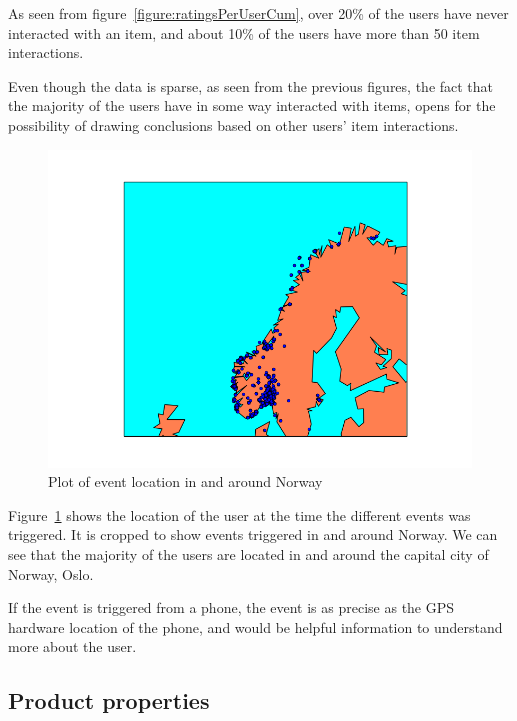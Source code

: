         As seen from figure~\ref{figure:ratingsPerUserCum}, over 20\% of the users have never interacted with an item, and about 10\% of the users have more than 50 item interactions.

        Even though the data is sparse, as seen from the previous figures, the fact that the majority of the users have in some way interacted with items, opens for the possibility of drawing conclusions based on other users' item interactions.

    \begin{figure}[H]
        \includegraphics[width=5in]{image/simpleGeoPlotNorway.png}
        \centering
        \caption{Plot of event location in and around Norway}
    \label{figure:croppedGeoplot}
    \end{figure}
        Figure~\ref{figure:croppedGeoplot} shows the location of the user at the time the different events was triggered.
        It is cropped to show events triggered in and around Norway.
        We can see that the majority of the users are located in and around the capital city of Norway, Oslo.

        If the event is triggered from a phone, the event is as precise as the GPS hardware location of the phone, and would be helpful information to understand more about the user.


\subsection{Product properties}


